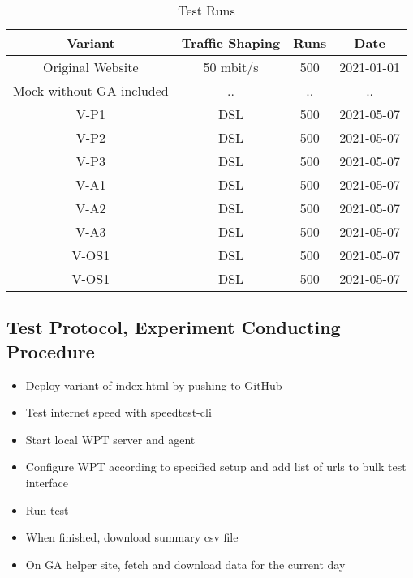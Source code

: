 



\begin{table}[h]
	\small
	\centering
	\begin{tabular}{ |c|c|c|c| } 
	 \hline
	  Variant \cellcolor{lightgrey} & Traffic Shaping \cellcolor{lightgrey} & Runs \cellcolor{lightgrey} & Date \cellcolor{lightgrey} \\
	  \hline
	  Original Website & 50 mbit/s & 500 & 2021-01-01 \\
	  Mock without GA included & .. & .. & .. \\
	  \hline
	  V-P1 & DSL & 500 & 2021-05-07 \\
	  V-P2 & DSL & 500 & 2021-05-07 \\
	  V-P3 & DSL & 500 & 2021-05-07 \\
	  \hline
	  V-A1 & DSL & 500 & 2021-05-07 \\
	  V-A2 & DSL & 500 & 2021-05-07 \\
	  V-A3 & DSL & 500 & 2021-05-07 \\
	  \hline
	  V-OS1 & DSL & 500 & 2021-05-07 \\
	  V-OS1 & DSL & 500 & 2021-05-07 \\
	  \hline
	  \end{tabular}
	\medskip
	\caption{Test Runs}
	\label{table:test_runs}
\end{table}



\subsection{Test Protocol, Experiment Conducting Procedure}

\begin{itemize}
\item Deploy variant of index.html by pushing to GitHub
\item Test internet speed with speedtest-cli
\item Start local WPT server and agent
\item Configure WPT according to specified setup and add list of urls to bulk test interface
\item Run test
\item When finished, download summary csv file
\item On GA helper site, fetch and download data for the current day
\end{itemize}




